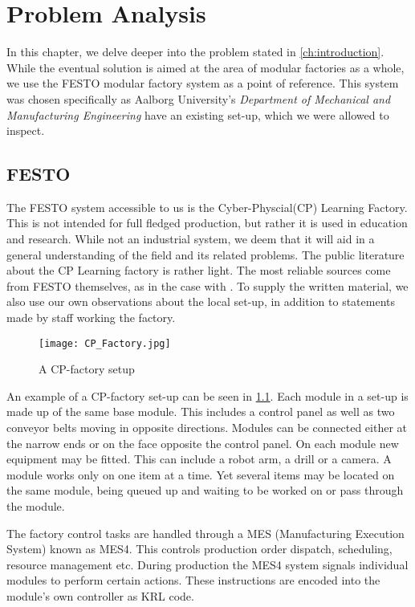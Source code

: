 \chapter{Problem Analysis}\label{ch:problemanalysis}
In this chapter, we delve deeper into the problem stated in \cref{ch:introduction}. While the eventual solution is aimed at the area of modular factories as a whole, we use the FESTO modular factory system \cite{FESTOweb} as a point of reference. This system was chosen specifically as Aalborg University's \textit{Department of Mechanical and Manufacturing Engineering} have an existing set-up, which we were allowed to inspect. 

\section{FESTO}\label{sec:festo}
The FESTO system accessible to us is the Cyber-Physcial(CP) Learning Factory. This is not intended for full fledged production, but rather it is used in education and research. While not an industrial system, we deem that it will aid in a general understanding of the field and its related problems. The public literature about the CP Learning factory is rather light. The most reliable sources come from FESTO themselves, as in the case with \cite{CPFactory2015}. To supply the written material, we also use our own observations about the local set-up, in addition to statements made by staff working the factory.  

\begin{figure}[h]
\centering
\texttt{[image: CP\_Factory.jpg]}
\caption{A CP-factory setup}
\label{fig:festo-example}
\end{figure}

An example of a CP-factory set-up can be seen in \cref{fig:festo-example}. Each module in a set-up is made up of the same base module. This includes a control panel as well as two conveyor belts moving in opposite directions. Modules can be connected either at the narrow ends or on the face opposite the control panel. On each module new equipment may be fitted. This can include a robot arm, a drill or a camera. A module works only on one item at a time. Yet several items may be located on the same module, being queued up and waiting to be worked on or pass through the module.

The factory control tasks are handled through a MES (Manufacturing Execution System) known as MES4. This controls production order dispatch, scheduling, resource management etc. During production the MES4 system signals individual modules to perform certain actions. These instructions are encoded into the module's own controller as KRL code.

